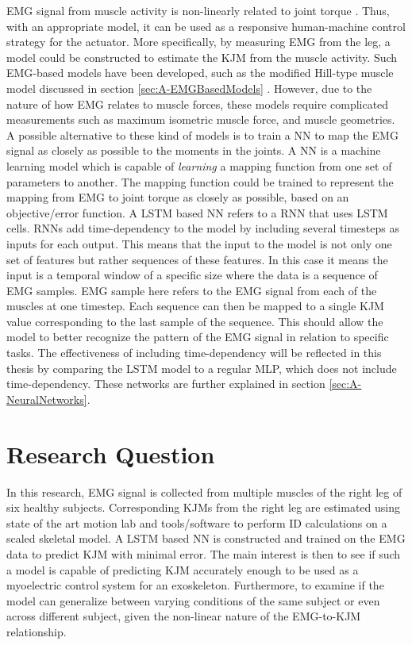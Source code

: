 \documentclass[../main.tex]{subfiles}
\begin{document}
\Ac{EMG} signal from muscle activity is non-linearly related to joint torque \cite{Young2017}.
Thus, with an appropriate model, it can be used as a responsive human-machine control strategy for the actuator.
More specifically, by measuring \ac{EMG} from the leg, a model could be constructed to estimate the \ac{KJM} from the muscle activity.
Such \ac{EMG}-based models have been developed, such as the modified Hill-type muscle model discussed in section \ref{sec:A-EMGBasedModels} \cite{Pizzolato2015, Erdemir2007, Lloyd2003}.
However, due to the nature of how \ac{EMG} relates to muscle forces, these models require complicated measurements such as maximum isometric muscle force, and muscle geometries.
A possible alternative to these kind of models is to train a \ac{NN} to map the \ac{EMG} signal as closely as possible to the moments in the joints.
A \ac{NN} is a machine learning model which is capable of \textit{learning} a mapping function from one set of parameters to another. 
The mapping function could be trained to represent the mapping from \ac{EMG} to joint torque as closely as possible, based on an objective/error function.
A \ac{LSTM} based \ac{NN} refers to a \ac{RNN} that uses \ac{LSTM} cells.
\acp{RNN} add time-dependency to the model by including several timesteps as inputs for each output.
This means that the input to the model is not only one set of features but rather sequences of these features.
In this case it means the input is a temporal window of a specific size where the data is a sequence of \ac{EMG} samples.
\ac{EMG} sample here refers to the \ac{EMG} signal from each of the muscles at one timestep.
Each sequence can then be mapped to a single \ac{KJM} value corresponding to the last sample of the sequence.
This should allow the model to better recognize the pattern of the \ac{EMG} signal in relation to specific tasks.
The effectiveness of including time-dependency will be reflected in this thesis by comparing the \ac{LSTM} model to a regular \ac{MLP}, which does not include time-dependency.
These networks are further explained in section \ref{sec:A-NeuralNetworks}.

\section{Research Question}
In this research, \ac{EMG} signal is collected from multiple muscles of the right leg of six healthy subjects. 
Corresponding \acp{KJM} from the right leg are estimated using state of the art motion lab and tools/software to perform \ac{ID} calculations on a scaled skeletal model.
A \ac{LSTM} based \ac{NN} is constructed and trained on the \ac{EMG} data to predict \ac{KJM} with minimal error.
The main interest is then to see if such a model is capable of predicting \ac{KJM} accurately enough to be used as a myoelectric control system for an exoskeleton.
Furthermore, to examine if the model can generalize between varying conditions of the same subject or even across different subject, given the non-linear nature of the \ac{EMG}-to-\ac{KJM} relationship.
\end{document}
